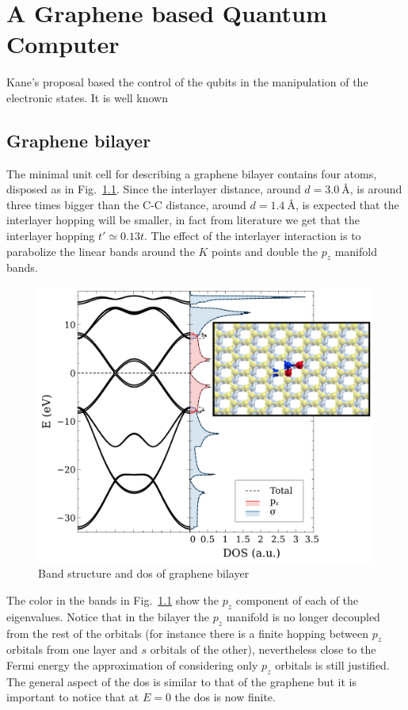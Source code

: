 \chapter{A Graphene based Quantum Computer}
Kane's proposal based the control of the qubits in the manipulation of the electronic states. It is well known


\section{Graphene bilayer}
The minimal unit cell for describing a graphene bilayer contains four atoms, disposed as in Fig.~\ref{bilayer}. Since the interlayer distance, around $d = \SI{3.0}{\angstrom}$, is  around three times bigger than the C-C distance, around $d = \SI{1.4}{\angstrom}$, is expected that the interlayer hopping will be smaller, in fact from literature we get that the interlayer hopping $t'\simeq 0.13t$. The effect of the interlayer interaction is to parabolize the linear bands around the $K$ points and double the $p_z$ manifold bands.
\begin{figure}[h!]
\centering
\includegraphics{chapter06/figures/bilayer_bandDOS.pdf}
\vspace{-5pt}
\caption{Band structure and \ac{dos} of graphene bilayer}
\label{bilayer}
\end{figure}
\FloatBarrier
The color in the bands in Fig.~\ref{bilayer} show the $p_z$ component of each of the eigenvalues. Notice that in the bilayer the $p_z$ manifold is no longer decoupled from the rest of the orbitals (for instance there is a finite hopping between $p_z$ orbitals from one layer and $s$ orbitals of the other), nevertheless close to the Fermi energy the approximation of considering only $p_z$ orbitals is still justified.
The general aspect of the \ac{dos} is similar to that of the graphene but it is important to notice that at $E=0$ the \ac{dos} is now finite.

